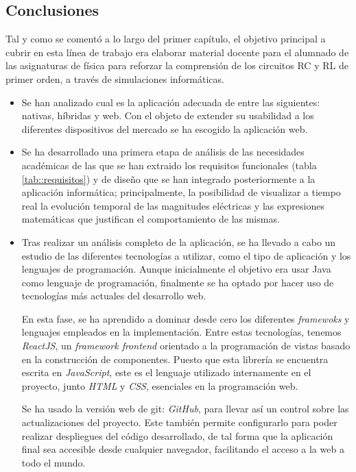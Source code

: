\documentclass[../main.tex]{subfiles}
\begin{document}
\subsection{Conclusiones}
Tal y como se comentó a lo largo del primer capítulo, el objetivo principal a cubrir en esta línea de trabajo era elaborar material docente para el alumnado de las asignaturas de física para reforzar la comprensión de los circuitos RC y RL de primer orden, a través de simulaciones informáticas.





\begin{itemize}

    \item Se han analizado cual es la aplicación adecuada de entre las siguientes: nativas, híbridas y web. Con el objeto de extender su usabilidad a los diferentes dispositivos del mercado se ha escogido la aplicación web.

    \item Se ha desarrollado una primera etapa de análisis de las necesidades académicas de las que se han extraido los requisitos funcionales (tabla \ref{tab::requisitos}) y de diseño que se han integrado posteriormente a la aplicación informática; principalmente, la posibilidad de visualizar a tiempo real la evolución temporal de las magnitudes eléctricas y las expresiones matemáticas que justifican el comportamiento de las mismas.
    
    \item Tras realizar un análisis completo de la aplicación, se ha llevado a cabo un estudio de las diferentes tecnologías a utilizar, como el tipo de aplicación y los lenguajes de programación. Aunque inicialmente el objetivo era usar Java como lenguaje de programación, finalmente se ha optado por hacer uso de tecnologías más actuales del desarrollo web.
    
    En esta fase, se ha aprendido a dominar desde cero los diferentes \textit{framewoks} y lenguajes empleados en la implementación. Entre estas tecnologías, tenemos \textit{ReactJS}, un \textit{framework frontend} orientado a la programación de vistas basado en la construcción de componentes. Puesto que esta librería se encuentra escrita en \textit{JavaScript}, este es el lenguaje utilizado internamente en el proyecto, junto \textit{HTML} y \textit{CSS}, esenciales en la programación web.

    Se ha usado la versión web de git: \textit{GitHub}, para llevar así un control sobre las actualizaciones del proyecto. Este también permite configurarlo para poder realizar despliegues del código desarrollado, de tal forma que la aplicación final sea accesible desde cualquier navegador, facilitando el acceso a la web a todo el mundo.
    

\end{itemize}
\end{document}
